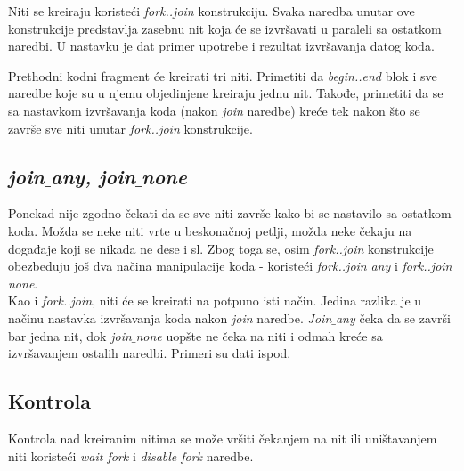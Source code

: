 Niti se kreiraju koristeći \emph{fork..join} konstrukciju. Svaka naredba unutar
ove konstrukcije predstavlja zasebnu nit koja će se izvršavati u paraleli sa
ostatkom naredbi. U nastavku je dat primer upotrebe i rezultat izvršavanja datog
koda.



Prethodni kodni fragment će kreirati tri niti. Primetiti da \emph{begin..end}
blok i sve naredbe koje su u njemu objedinjene kreiraju jednu nit. Takođe,
primetiti da se sa nastavkom izvršavanja koda (nakon \emph{join} naredbe) kreće
tek nakon što se završe sve niti unutar \emph{fork..join} konstrukcije.


\subsection{\emph{join\(\_\)any, join\(\_\)none}}

Ponekad nije zgodno čekati da se sve niti završe kako bi se nastavilo sa
ostatkom koda. Možda se neke niti vrte u beskonačnoj petlji, možda neke čekaju
na događaje koji se nikada ne dese i sl. Zbog toga se, osim \emph{fork..join}
konstrukcije obezbeđuju još dva načina manipulacije koda - koristeći
\emph{fork..join\(\_\)any} i \emph{fork..join\(\_\)none}.\\

Kao i \emph{fork..join}, niti će se kreirati na potpuno isti način. Jedina
razlika je u načinu nastavka izvršavanja koda nakon \emph{join} naredbe.
\emph{Join\(\_\)any} čeka da se završi bar jedna nit, dok \emph{join\(\_\)none}
uopšte ne čeka na niti i odmah kreće sa izvršavanjem ostalih naredbi. Primeri su
dati ispod.






\subsection{Kontrola}

Kontrola nad kreiranim nitima se može vršiti čekanjem na nit ili uništavanjem
niti koristeći \emph{wait fork} i \emph{disable fork} naredbe.

